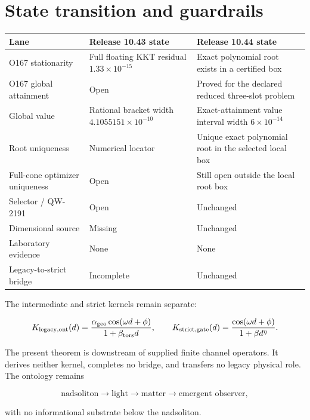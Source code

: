 \documentclass[11pt,a4paper,openany]{report}
\begin{document}
\chapter{State transition and guardrails}

\begin{center}
\begingroup\small
\setlength{\tabcolsep}{2.5pt}
\renewcommand{\arraystretch}{1.16}
\begin{longtable}{@{}p{}p{}p{}@{}}
\toprule
\textbf{Lane} & \textbf{Release 10.43 state} & \textbf{Release 10.44 state} \\
\midrule
\endhead
O167 stationarity & Full floating KKT residual \(1.33\times10^{-15}\) & Exact polynomial root exists in a certified box \\
O167 global attainment & Open & Proved for the declared reduced three-slot problem \\
Global value & Rational bracket width \(4.1055151\times10^{-10}\) & Exact-attainment value interval width \(6\times10^{-14}\) \\
Root uniqueness & Numerical locator & Unique exact polynomial root in the selected local box \\
Full-cone optimizer uniqueness & Open & Still open outside the local root box \\
Selector /\allowbreak{} QW-2191 & Open & Unchanged \\
Dimensional source & Missing & Unchanged \\
Laboratory evidence & None & None \\
Legacy-to-strict bridge & Incomplete & Unchanged \\
\bottomrule
\end{longtable}
\endgroup
\end{center}

The intermediate and strict kernels remain separate:

\[
K_{\rm legacy,ont}(d)=
\frac{\alpha_{\rm geo}\cos(\omega d+\phi)}
{1+\beta_{\rm tors}d},
\qquad
K_{\rm strict,gate}(d)=
\frac{\cos(\omega d+\phi)}{1+\beta d^\eta}.
\]

The present theorem is downstream of supplied finite channel operators. It derives neither kernel, completes no bridge, and transfers no legacy physical role. The ontology remains

\[
\text{nadsoliton}\longrightarrow\text{light}\longrightarrow
\text{matter}\longrightarrow\text{emergent observer},
\]

with no informational substrate below the nadsoliton.
\end{document}
